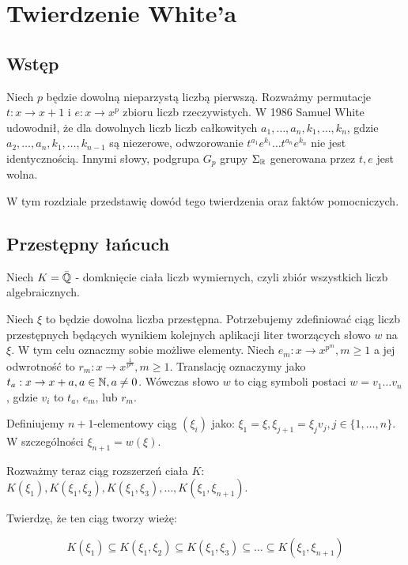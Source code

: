 \chapter{Twierdzenie White'a}

\section{Wstęp}

Niech $p$ będzie dowolną nieparzystą liczbą pierwszą. Rozważmy permutacje $t :
x \rightarrow  x+1$ i $e: x \rightarrow x^p$ zbioru liczb rzeczywistych. W 1986
Samuel White \cite{whi88} udowodnił, że dla dowolnych liczb liczb całkowitych
$a_1, \ldots, a_n, k_1, \ldots, k_n$, gdzie $a_2, \ldots, a_n, k_1, \ldots,
k_{n-1}$ są niezerowe, odwzorowanie $t^{a_1}e^{k_1}\ldots t^{a_n}e^{k_n}$ nie
jest identycznością. Innymi słowy, podgrupa $G_p$ grupy $\Sigma_{\mathbb{R}}$ generowana
przez $t, e$ jest wolna.

W tym rozdziale przedstawię dowód tego twierdzenia oraz faktów pomocniczych.

\section{Przestępny łańcuch}
\label{sec:przelan}

Niech $K = \bar{\mathbb{Q}}$ - domknięcie ciała liczb wymiernych, czyli zbiór wszystkich
liczb algebraicznych.

Niech $\xi$ to będzie dowolna liczba przestępna. Potrzebujemy zdefiniować ciąg
liczb przestępnych będących wynikiem kolejnych aplikacji liter tworzących słowo
$w$ na $\xi$. W tym celu oznaczmy sobie możliwe elementy. Niech $e_m: x
\rightarrow x^{p^m}, m \geq 1$ a jej odwrotność to $r_m: x \rightarrow
x^{\frac{1}{p^m}}, m \geq 1$. Translację oznaczymy jako $t_a: x \rightarrow x +
a, a \in \mathbb{N}, a \neq 0$.  Wówczas słowo $w$ to ciąg symboli postaci $w =
v_1\ldots v_n$, gdzie $v_i$ to $t_a$, $e_m$, lub $r_m$. 

Definiujemy $n+1$-elementowy ciąg $\left(\xi_i\right)$ jako: $\xi_1 = \xi,
\xi_{j+1} = \xi_{j}v_j, j \in \{1, \ldots, n\}$. W szczególności $\xi_{n+1} =
w(\xi)$.

Rozważmy teraz ciąg rozszerzeń ciała $K$:
$
K\left(\xi_1\right),
K\left(\xi_1, \xi_2\right),
K\left(\xi_1, \xi_3\right),
\ldots,
K\left(\xi_1, \xi_{n+1}\right)$.

Twierdzę, że ten ciąg tworzy wieżę:

\begin{equation}
K\left(\xi_1\right) \subseteq
K\left(\xi_1, \xi_2\right) \subseteq
K\left(\xi_1, \xi_3\right) \subseteq 
\ldots
\subseteq
K\left(\xi_1, \xi_{n+1}\right)
\label{eq:tower}
\end{equation}

